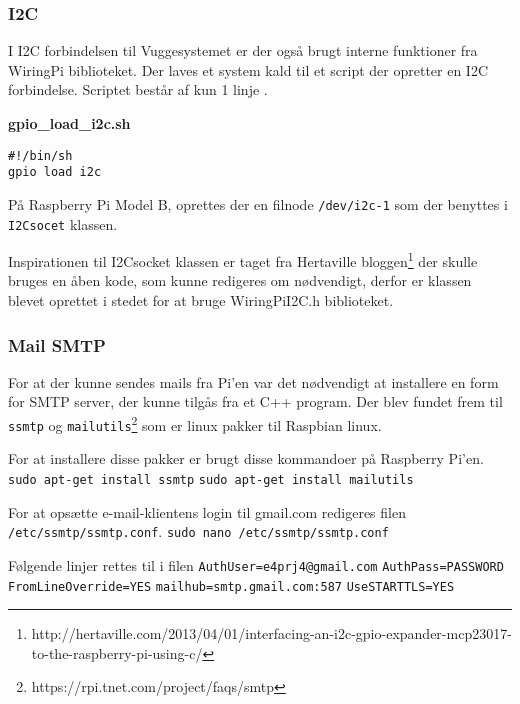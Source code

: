 \subsubsection*{I2C}

I I2C forbindelsen til Vuggesystemet er der også brugt interne funktioner fra WiringPi biblioteket. Der laves et system kald til et script der opretter en I2C forbindelse. Scriptet består af kun 1 linje .

\textbf{gpio\_load\_i2c.sh}
\begin{lstlisting}
#!/bin/sh
gpio load i2c
\end{lstlisting}

På Raspberry Pi Model B, oprettes der en filnode \verb+/dev/i2c-1+ som der benyttes i \verb+I2Csocet+ klassen.

Inspirationen til I2Csocket klassen er taget fra Hertaville bloggen\footnote{http://hertaville.com/2013/04/01/interfacing-an-i2c-gpio-expander-mcp23017-to-the-raspberry-pi-using-c/} der skulle bruges en åben kode, som kunne redigeres om nødvendigt, derfor er klassen blevet oprettet i stedet for at bruge WiringPiI2C.h biblioteket.

\subsubsection*{Mail SMTP}

For at der kunne sendes mails fra Pi'en var det nødvendigt at installere en form for SMTP server, der kunne tilgås fra et C++ program. Der blev fundet frem til \verb+ssmtp+ og \verb+mailutils+\footnote{https://rpi.tnet.com/project/faqs/smtp} som er linux pakker til Raspbian linux.

For at installere disse pakker er brugt disse kommandoer på Raspberry Pi'en. \newline
\verb+sudo apt-get install ssmtp+ \newline
\verb+sudo apt-get install mailutils+

For at opsætte e-mail-klientens login til gmail.com redigeres filen \verb+/etc/ssmtp/ssmtp.conf+. \newline
\verb+sudo nano /etc/ssmtp/ssmtp.conf+

Følgende linjer rettes til i filen\newline
\verb+AuthUser=e4prj4@gmail.com+ \newline
\verb+AuthPass=PASSWORD+ \newline
\verb+FromLineOverride=YES+ \newline
\verb+mailhub=smtp.gmail.com:587+ \newline
\verb+UseSTARTTLS=YES+

